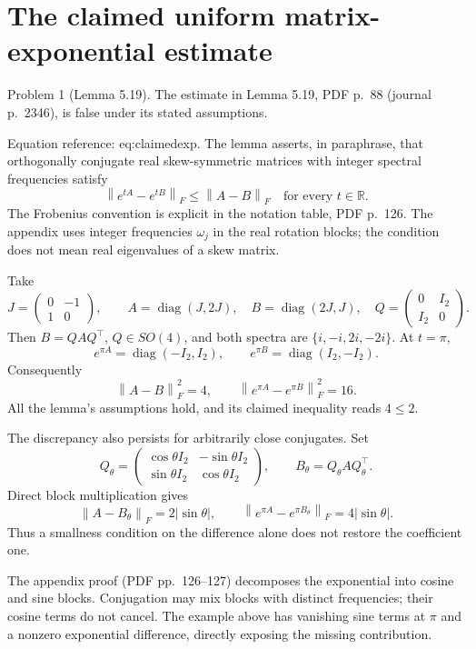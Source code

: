 \documentclass[10pt]{article}
\begin{document}
\section*{The claimed uniform matrix-exponential estimate}
Problem 1 (Lemma 5.19).  The estimate in Lemma 5.19, PDF p. 88 (journal p. 2346), is false under its stated assumptions.\par
Equation reference: eq:claimedexp. The lemma asserts, in paraphrase, that orthogonally conjugate real skew-symmetric matrices with integer spectral frequencies satisfy \[
 \left\lVert e^{tA}-e^{tB}\right\rVert_F\le \left\lVert A-B\right\rVert_F
 \quad\text{for every }t\in\mathbb R.\] The Frobenius convention is explicit in the notation table, PDF p. 126. The appendix uses integer frequencies \(\omega_j\) in the real rotation blocks; the condition does not mean real eigenvalues of a skew matrix.\par
Take \[J=\begin{pmatrix}0&-1\\1&0\end{pmatrix},\qquad
 A=\operatorname{diag}(J,2J),\quad B=\operatorname{diag}(2J,J),\quad
 Q=\begin{pmatrix}0&I_2\\I_2&0\end{pmatrix}.\] Then \(B=QAQ^\top\), \(Q\in SO(4)\), and both spectra are \(\{i,-i,2i,-2i\}\). At \(t=\pi\), \[e^{\pi A}=\operatorname{diag}(-I_2,I_2),\qquad
 e^{\pi B}=\operatorname{diag}(I_2,-I_2).\] Consequently \[\left\lVert A-B\right\rVert_F^2=4,\qquad
 \left\lVert e^{\pi A}-e^{\pi B}\right\rVert_F^2=16.\] All the lemma’s assumptions hold, and its claimed inequality reads \(4\le2\).\par
The discrepancy also persists for arbitrarily close conjugates. Set \[Q_\theta=\begin{pmatrix}\cos\theta I_2&-\sin\theta I_2\\
                  \sin\theta I_2&\cos\theta I_2\end{pmatrix},
 \qquad B_\theta=Q_\theta A Q_\theta^\top.\] Direct block multiplication gives \[\left\lVert A-B_\theta\right\rVert_F=2|\sin\theta|,\qquad
 \left\lVert e^{\pi A}-e^{\pi B_\theta}\right\rVert_F=4|\sin\theta|.\] Thus a smallness condition on the difference alone does not restore the coefficient one.\par
The appendix proof (PDF pp. 126–127) decomposes the exponential into cosine and sine blocks. Conjugation may mix blocks with distinct frequencies; their cosine terms do not cancel. The example above has vanishing sine terms at \(\pi\) and a nonzero exponential difference, directly exposing the missing contribution.\par
\end{document}
